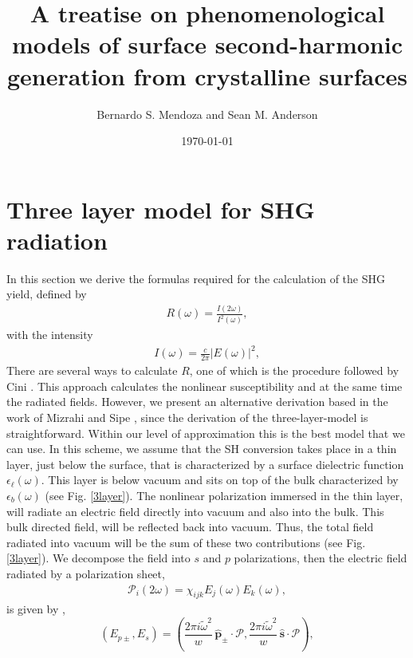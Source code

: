\documentclass[10pt]{article}
\title{A treatise on phenomenological models of surface second-harmonic
generation from crystalline surfaces}
\author{Bernardo S. Mendoza and Sean M. Anderson}
\date{\today}
\begin{document}
\maketitle
\tableofcontents
\pagebreak

\section{Three layer model for SHG radiation}

In this section we derive the formulas required for the calculation of the SHG
yield, defined by
\begin{align}\label{uno}
R(\omega)=\frac{I(2\omega)}{I^2(\omega)}
,
\end{align}
with the intensity
\begin{align}\label{dos}
I(\omega)=\frac{c}{2\pi}|E(\omega)|^2
,
\end{align}
There are several ways to calculate $R$, one of which is the procedure followed
by Cini \cite{ciniPRB91}. This approach calculates the nonlinear susceptibility
and at the same time the radiated fields. However, we present an alternative
derivation based in the work of Mizrahi and Sipe \cite{mizrahiJOSA88}, since
the derivation of the three-layer-model is straightforward. Within our level of
approximation this is the best model that we can use. In this scheme, we assume
that the SH conversion takes place in a thin layer, just below the surface,
that is characterized by a surface dielectric function
$\epsilon_{\ell}(\omega)$. This layer is below vacuum and sits on top of the
bulk characterized by $\epsilon_{b}(\omega)$ (see Fig. \ref{3layer}). The
nonlinear polarization immersed in the thin layer, will radiate an electric
field directly into vacuum and also into the bulk. This bulk directed field,
will be reflected back into vacuum. Thus, the total field radiated into vacuum
will be the sum of these two contributions (see Fig. \ref{3layer}). We
decompose the field into $s$ and $p$ polarizations, then the electric field
radiated by a polarization sheet,
\begin{align}\label{tres}
\mathcal{P}_i(2\omega)=\chi_{ijk}E_{j}(\omega)E_{k}(\omega)
,
\end{align}
is given by \cite{mizrahiJOSA88},
\begin{equation}\label{r2}
(E_{p\pm},E_s) = 
(\frac{2\pi i\tilde{\omega}^2}{w}
\,\hat{\mathbf{p}}_\pm\cdot\boldsymbol{\mathcal{P}},
\frac{2\pi i\tilde{\omega}^2}{w}
\,\hat{\mathbf{s}}\cdot\boldsymbol{\mathcal{P}}),
\end{equation}
\end{document}
